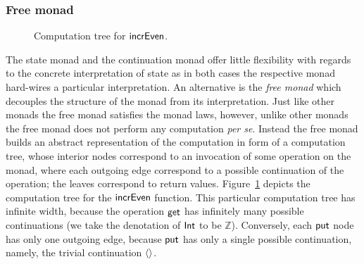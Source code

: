 \documentclass[12pt,phd,lfcs,twoside,openright,logo,leftchapter,normalheadings]{infthesis}
\theoremstyle{plain}
\theoremstyle{definition}
\begin{document}
\subsubsection{Free monad}
%
\begin{figure}
  \centering
  \compTreeEx
  \caption{Computation tree for $\mathsf{incrEven}$.}\label{fig:comptree}
\end{figure}
%
The state monad and the continuation monad offer little flexibility
with regards to the concrete interpretation of state as in both cases
the respective monad hard-wires a particular interpretation. An
alternative is the \emph{free monad} which decouples the structure of
the monad from its interpretation.
%
Just like other monads the free monad satisfies the monad laws,
however, unlike other monads the free monad does not perform any
computation \emph{per se}. Instead the free monad builds an abstract
representation of the computation in form of a computation tree, whose
interior nodes correspond to an invocation of some operation on the
monad, where each outgoing edge correspond to a possible continuation
of the operation; the leaves correspond to return
values. Figure~\ref{fig:comptree} depicts the computation tree for the
$\mathsf{incrEven}$ function. This particular computation tree has infinite
width, because the operation $\mathsf{get}$ has infinitely many possible
continuations (we take the denotation of $\mathsf{Int}$ to be
$\mathbb{Z}$). Conversely, each $\mathsf{put}$ node has only one outgoing
edge, because $\mathsf{put}$ has only a single possible continuation, namely,
the trivial continuation $\langle  \rangle$.
\end{document}
